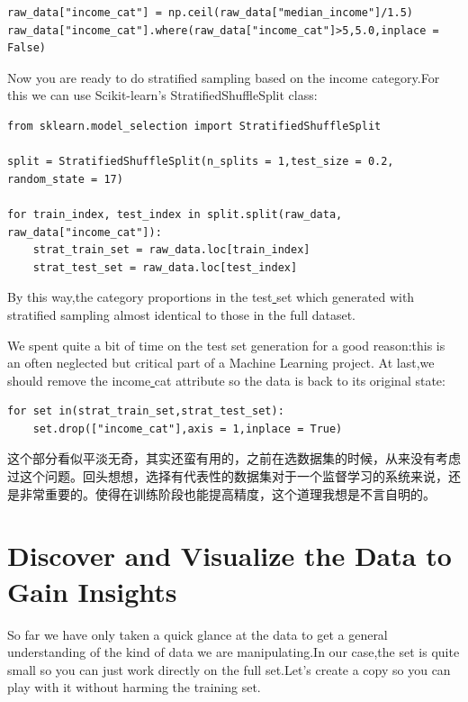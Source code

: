 \documentclass[UTF8]{ctexart}
\begin{document}
\begin{lstlisting}
raw_data["income_cat"] = np.ceil(raw_data["median_income"]/1.5)
raw_data["income_cat"].where(raw_data["income_cat"]>5,5.0,inplace = False)
\end{lstlisting}

Now you are ready to do stratified sampling based on the income category.For this we can use Scikit-learn's StratifiedShuffleSplit class:

\begin{lstlisting}
from sklearn.model_selection import StratifiedShuffleSplit

split = StratifiedShuffleSplit(n_splits = 1,test_size = 0.2, random_state = 17)

for train_index, test_index in split.split(raw_data, raw_data["income_cat"]):
    strat_train_set = raw_data.loc[train_index]
    strat_test_set = raw_data.loc[test_index]	
\end{lstlisting}

By this way,the category proportions in the test\underline{ }set which generated with stratified sampling almost identical to those in the full dataset.

We spent quite a bit of time on the test set generation for a good reason:this is an often neglected but critical part of a Machine Learning project.
At last,we should remove the income\underline{ }cat attribute so the data is back to its original state:

\begin{lstlisting}
for set in(strat_train_set,strat_test_set):
	set.drop(["income_cat"],axis = 1,inplace = True)
\end{lstlisting}


这个部分看似平淡无奇，其实还蛮有用的，之前在选数据集的时候，从来没有考虑过这个问题。回头想想，选择有代表性的数据集对于一个监督学习的系统来说，还是非常重要的。使得在训练阶段也能提高精度，这个道理我想是不言自明的。

\section{Discover and Visualize the Data to Gain Insights}

So far we have only taken a quick glance at the data to get a general understanding of the kind of data we are manipulating.In our case,the set is quite small so you can just work directly on the full set.Let's create a copy so you can play with it without harming the training set.
\end{document}

